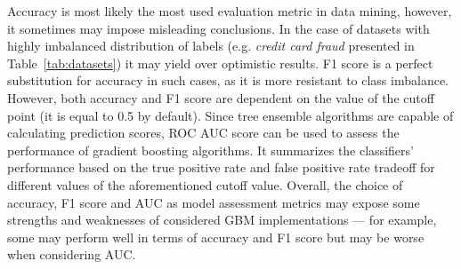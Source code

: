 \documentclass[magisterska, english]{pwr_wmat_praca_dyplomowa}
\theoremstyle{plain}
\numberwithin{theorem}{chapter}
\theoremstyle{definition}
\numberwithin{theorem}{chapter}
\begin{document}
Accuracy is most likely the most used evaluation metric in data mining, however, it sometimes may impose misleading conclusions. In the case of datasets with highly imbalanced distribution of labels (e.g. \emph{credit card fraud} presented in Table~\ref{tab:datasets}) it may yield over optimistic results. F1 score is a perfect substitution for accuracy in such cases, as it is more resistant to class imbalance. However, both accuracy and F1 score are dependent on the value of the cutoff point (it is equal to 0.5 by default). Since tree ensemble algorithms are capable of calculating prediction scores, ROC AUC score can be used to assess the performance of gradient boosting algorithms. It summarizes the classifiers' performance based on the true positive rate and false positive rate tradeoff for different values of the aforementioned cutoff value. Overall, the choice of accuracy, F1 score and AUC as model assessment metrics may expose some strengths and weaknesses of considered GBM implementations --- for example, some may perform well in terms of accuracy and F1 score but may be worse when considering AUC.
\end{document}
